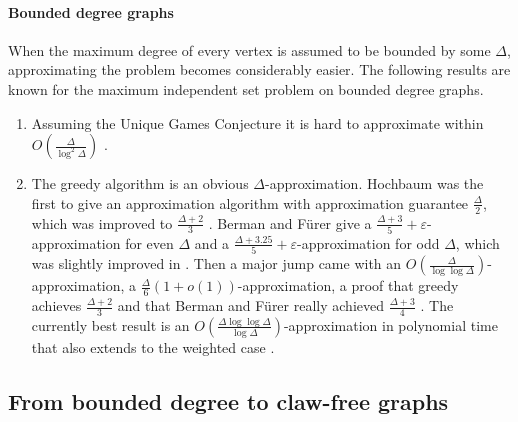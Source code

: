 \paragraph{Bounded degree graphs}
When the maximum degree of every vertex is assumed to be bounded by some $\Delta$, approximating the problem becomes considerably easier. The following results are known for the maximum independent set problem on bounded degree graphs.
%
\begin{enumerate}
  \item Assuming the Unique Games Conjecture \cite{UGC} it is hard to approximate within $O \left( \frac{\Delta}{\log^2 \Delta} \right)$ \cite{Bounded1}.
  \item %
  The greedy algorithm is an obvious $\Delta$-approximation. Hochbaum \cite{Hochbaum} was the first to give an approximation algorithm with approximation guarantee $\frac{\Delta}{2}$, which was improved to $\frac{\Delta+2}{3}$ \cite{GreedIsGood,HalldorssonLau}. Berman and F\"{u}rer \cite{BermanMIS} give a $\frac{\Delta+3}{5} + \varepsilon$-approximation for even $\Delta$ and a $\frac{\Delta+3.25}{5} + \varepsilon$-approximation for odd $\Delta$, which was slightly improved in \cite{BermanFujito}. Then a major jump came with an $O \left( \frac{\Delta}{ \log \log \Delta} \right)$-approximation, a $\frac{\Delta}{6}(1+o(1))$-approximation, a proof that greedy achieves $\frac{\Delta+2}{3}$ and that Berman and F\"{u}rer really achieved $\frac{\Delta+3}{4}$ \cite{Bounded2}. The currently best result is an $O \left( \frac{\Delta \log \log \Delta}{\log \Delta} \right)$-approximation in polynomial time that also extends to the weighted case \cite{Halperin,SpecialWeight,Vishwanathan}.
\end{enumerate}

\subsection{From bounded degree to claw-free graphs}\label{subsec:DiscIS2}

